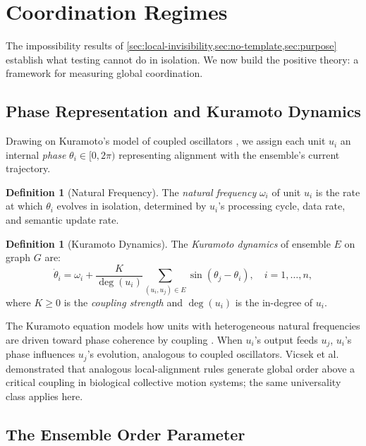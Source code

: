\documentclass[twocolumn,a4paper,11pt]{article}
\theoremstyle{plain}
\theoremstyle{definition}
\newtheorem{definition}[theorem]{Definition}
\theoremstyle{remark}
\begin{document}
\section{Coordination Regimes}
\label{sec:kuramoto}

The impossibility results of \cref{sec:local-invisibility,sec:no-template,sec:purpose}
establish what testing cannot do in isolation. We now build the positive
theory: a framework for measuring global coordination.

\subsection{Phase Representation and Kuramoto Dynamics}

Drawing on Kuramoto's model of coupled oscillators \cite{kuramoto1975,
kuramoto1984}, we assign each unit $u_i$ an internal \emph{phase}
$\theta_i \in [0, 2\pi)$ representing alignment with the ensemble's
current trajectory.

\begin{definition}[Natural Frequency]
\label{def:natural-freq}
The \emph{natural frequency} $\omega_i$ of unit $u_i$ is the rate at
which $\theta_i$ evolves in isolation, determined by $u_i$'s processing
cycle, data rate, and semantic update rate.
\end{definition}

\begin{definition}[Kuramoto Dynamics]
\label{def:kuramoto}
The \emph{Kuramoto dynamics} of ensemble $E$ on graph $G$ are:
\[
  \dot{\theta}_i = \omega_i + \frac{K}{\deg(u_i)}
  \sum_{(u_i, u_j) \in E} \sin(\theta_j - \theta_i),
  \quad i = 1, \ldots, n,
\]
where $K \geq 0$ is the \emph{coupling strength} and $\deg(u_i)$ is
the in-degree of $u_i$.
\end{definition}

The Kuramoto equation models how units with heterogeneous natural
frequencies are driven toward phase coherence by coupling
\cite{strogatz2000}. When $u_i$'s output feeds $u_j$, $u_i$'s phase
influences $u_j$'s evolution, analogous to coupled oscillators. Vicsek
et al.\ \cite{vicsek1995} demonstrated that analogous local-alignment
rules generate global order above a critical coupling in biological
collective motion systems; the same universality class applies here.

\subsection{The Ensemble Order Parameter}
\end{document}
